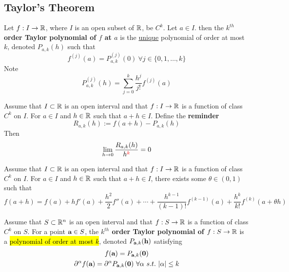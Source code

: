 \documentclass[11pt]{article}
\begin{document}
		\subsection{Taylor's Theorem}
			\begin{definition}
				Let $f: I \to \mathbb{R}$, where $I$ is an open subset of $\mathbb{R}$, be $C^k$. Let $a \in I$. then the \textbf{$k^{th}$ order Taylor polynomial of $f$ at $a$} is the \ul{unique} polynomial of order at most $k$, denoted $P_{a, k}(h)$ such that 
				\begin{equation}
					f^{(j)}(a) = P^{(j)}_{a, k}(0)\ \forall j \in \{0, 1, \dots, k\}
				\end{equation}
				Note 
				\begin{equation}
					P^{(j)}_{a, k}(h) = \sum_{j=0}^k \frac{h^j}{j!} f^{(j)} (a)
				\end{equation}
			\end{definition}
			
			\begin{theorem}
				Assume that $I \subset \mathbb{R}$ is an open interval and that $f: I \to \mathbb{R}$ is a function of class $C^k$ on $I$. For $a \in I$ and $h \in \mathbb{R}$ such that $a + h \in I$. Define the \textbf{reminder} 
				\begin{equation}
					R_{a, k}(h) := f(a+h) - P_{a,k}(h)
				\end{equation} 
				Then
				\begin{equation}
					\lim_{h \to 0} \frac{R_{a, k}(h)}{h^{\textcolor{red}{k}}} = 0
				\end{equation}
			\end{theorem}
			
			\begin{proposition}
				Assume that $I \subset \mathbb{R}$ is an open interval and that $f: I \to \mathbb{R}$ is a function of class $C^k$ on $I$. For $a \in I$ and $h \in \mathbb{R}$ such that $a + h \in I$, there exists some $\theta \in (0, 1)$ such that
					\begin{equation}
						f(a+h) = f(a) + h f'(a) + \frac {h^2}{2}f''(a) + \cdots + \frac {h^{k-1}}{(k-1)!} f^{(k-1)}(a) +
						\frac {h^k}{k!} f^{(k)}(a+\theta h)
					\end{equation}
			\end{proposition}
			
			\begin{definition}
				Assume that $S \subset \mathbb{R}^n$ is an open interval and that $f: S \to \mathbb{R}$ is a function of class $C^k$ on $S$. For a point $\textbf{a} \in S$, the \textbf{$k^{th}$ order Taylor polynomial of $f: S \to \mathbb{R}$} is a \hl{polynomial of order at most $k$}, denoted $P_{\textbf{a}, k}(\textbf{h})$ satisfying
				\begin{gather}
					f(\textbf{a}) = P_{\textbf{a}, k}(\textbf{0}) \\
					\partial^\alpha f(\textbf{a}) = \partial^\alpha P_{\textbf{a}, k}(\textbf{0})\ \forall \alpha\ s.t.\ |\alpha| \leq k
				\end{gather}
			\end{definition}
			
\end{document}

